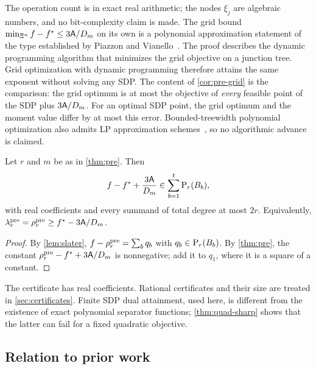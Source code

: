 The operation count is in exact real arithmetic; the nodes $\xi_j$ are
algebraic numbers, and no bit-complexity claim is made. The grid bound
$\min_{\Xi^n}f-f^{*}\le3\mathsf{A}/D_m$ on its own is a polynomial
approximation statement of the type established by Piazzon and
Vianello~\cite{piazzon2018-chebyshev-grids}. The proof describes the dynamic
programming algorithm that minimizes the grid objective on a junction tree. Grid
optimization with dynamic programming therefore attains the same exponent
without solving any SDP. The content of \cref{cor:pre-grid} is the
comparison: the grid optimum is at most the objective of \emph{every}
feasible point of the SDP plus $3\mathsf{A}/D_m$. For an optimal SDP point,
the grid optimum and the moment value differ by at most this error.
Bounded-treewidth polynomial
optimization also admits LP approximation schemes~\cite{bienstock2018-lp-formulations-for-polynomial-optimization},
so no algorithmic advance is claimed.

\begin{corollary}\label{cor:pre-certificate}
Let $r$ and $m$ be as in \cref{thm:pre}. Then
\[
  f-f^{*}+\frac{3\mathsf{A}}{D_m}\in\sum_{b=1}^t\mathrm{P}_r(B_b),
\]
with real coefficients and every summand of total degree at most $2r$.
Equivalently, $\lambda^{\mathrm{pre}}_r=\rho^{\mathrm{pre}}_r\ge f^{*}-3\mathsf{A}/D_m$.
\end{corollary}

\begin{proof}
By \cref{lem:slater}, $f-\rho^{\mathrm{pre}}_r=\sum_bq_b$ with
$q_b\in\mathrm{P}_r(B_b)$. By \cref{thm:pre}, the constant
$\rho^{\mathrm{pre}}_r-f^{*}+3\mathsf{A}/D_m$ is nonnegative; add it to $q_1$, where it is a
square of a constant.
\end{proof}

The certificate has real coefficients. Rational certificates and their size
are treated in \cref{sec:certificates}. Finite SDP dual attainment, used
here, is different from the existence of exact polynomial separator
functions; \cref{thm:quad-sharp} shows that the latter can fail for a fixed
quadratic objective.

\subsection{Relation to prior work}\label{sec:ker-prior}


